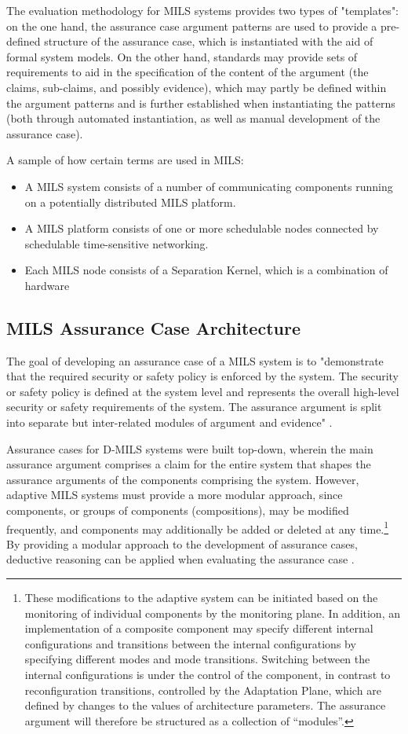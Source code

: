 \documentclass[12pt,twoside,a4paper]{article}
\begin{document}
The evaluation methodology for MILS systems provides two types of "templates": on the one hand, the assurance case argument patterns are used to provide a pre-defined structure of the assurance case, which is instantiated with the aid of formal system models. On the other hand, standards may provide sets of requirements to aid in the specification of the content of the argument (the claims, sub-claims, and possibly evidence), which may partly be defined within the argument patterns and is further established when instantiating the patterns (both through automated instantiation, as well as manual development of the assurance case).

A sample of how certain terms are used in MILS:
\begin{itemize}
	\item A MILS system consists of a number of communicating components running on a potentially distributed MILS platform.
	\item A MILS platform consists of one or more schedulable nodes connected by schedulable time-sensitive networking.
	\item Each MILS node consists of a Separation Kernel, which is a combination of hardware
\end{itemize}

\subsection{MILS Assurance Case Architecture}
The goal of developing an assurance case of a MILS system is to "demonstrate that the required security or safety policy is enforced by the system. The security or safety policy is defined at the system level and represents the overall high-level security or safety requirements of the system. The assurance argument is split into separate but inter-related modules of argument and evidence" \cite{D-MILS-D4.2}. 

Assurance cases for D-MILS systems were built top-down, wherein the main assurance argument comprises a claim for the entire system that shapes the assurance arguments of the components comprising the system. However, adaptive MILS systems must provide a more modular approach, since components, or groups of components (compositions), may be modified frequently, and components may additionally be added or deleted at any time.\footnote{These modifications to the adaptive system can be initiated based on the monitoring of individual components by the monitoring plane. In addition, an implementation of a composite component may specify different internal configurations and transitions between the internal configurations by specifying different modes and mode transitions. Switching between the internal configurations is under the control of the component, in contrast to reconfiguration transitions, controlled by the Adaptation Plane, which are defined by changes to the values of architecture parameters. The assurance argument will therefore be structured as a collection of ``modules''.} By providing a modular approach to the development of assurance cases, deductive reasoning can be applied when evaluating the assurance case \cite{Rushby15:Evaluation}.
\end{document}
